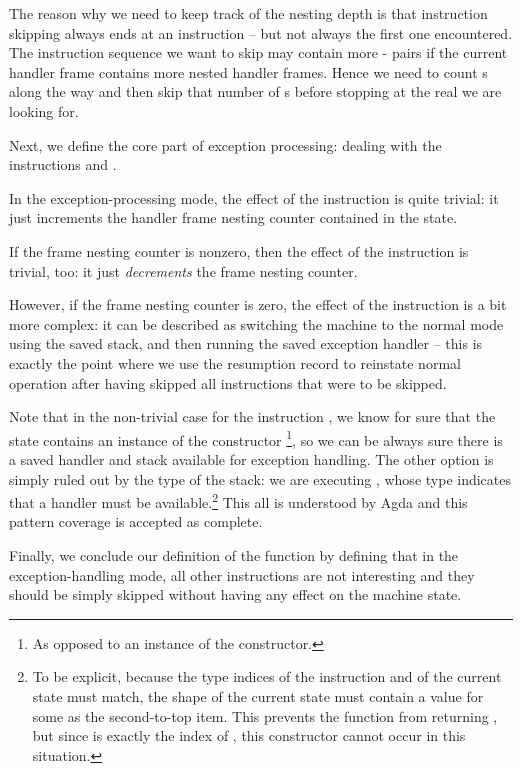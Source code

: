 The reason why we need to keep track of the nesting depth is that instruction
skipping always ends at an  instruction -- but not always the
first one encountered. The instruction sequence we want to skip may contain
more - pairs if the current handler frame contains
more nested handler frames. Hence we need to count s along the way
and then skip that number of s before stopping at the real
 we are looking for.

Next, we define the core part of exception processing: dealing with the
instructions  and .

In the exception-processing mode, the effect of the instruction  is
quite trivial: it just increments the handler frame nesting counter contained
in the state.

If the frame nesting counter is nonzero, then the effect of the instruction
 is trivial, too: it just \emph{decrements} the frame nesting
counter.

However, if the frame nesting counter is zero, the effect of the instruction
 is a bit more complex: it can be described as switching the
machine to the normal mode using the saved stack, and then running the saved
exception handler -- this is exactly the point where we use the resumption
record to reinstate normal operation after having skipped all instructions that
were to be skipped.

Note that in the non-trivial case for the instruction , we know
for sure that the state contains an instance of the  constructor%
\footnote{As opposed to an instance of the  constructor.}, so
we can be always sure there is a saved handler and stack available for
exception handling. The other option is simply ruled out by the type of the
stack: we are executing , whose type indicates that a handler
must be available.\footnote{To be explicit, because the type indices of the
	instruction  and of the current state must match, the shape
	of the current state must contain a value  for some 
	as the second-to-top item.  This prevents the function 
from returning , but since  is exactly the index
of , this constructor cannot occur in this situation.} This all
is understood by Agda and this pattern coverage is accepted as complete.

Finally, we conclude our definition of the function  by
defining that in the exception-handling mode, all other instructions are not
interesting and they should be simply skipped without having any effect on the
machine state.

